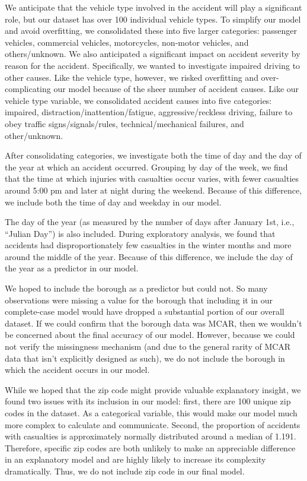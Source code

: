 \documentclass[
  letterpaper,
  DIV=11,
  numbers=noendperiod]{scrartcl}
\begin{document}
We anticipate that the vehicle type involved in the accident will play a
significant role, but our dataset has over 100 individual vehicle types.
To simplify our model and avoid overfitting, we consolidated these into
five larger categories: passenger vehicles, commercial vehicles,
motorcycles, non-motor vehicles, and others/unknown. We also anticipated
a significant impact on accident severity by reason for the accident.
Specifically, we wanted to investigate impaired driving to other causes.
Like the vehicle type, however, we risked overfitting and
over-complicating our model because of the sheer number of accident
causes. Like our vehicle type variable, we consolidated accident causes
into five categories: impaired, distraction/inattention/fatigue,
aggressive/reckless driving, failure to obey traffic
signs/signals/rules, technical/mechanical failures, and other/unknown.

After consolidating categories, we investigate both the time of day and
the day of the year at which an accident occurred. Grouping by day of
the week, we find that the time at which injuries with casualties occur
varies, with fewer casualties around 5:00 pm and later at night during
the weekend. Because of this difference, we include both the time of day
and weekday in our model.

The day of the year (as measured by the number of days after January
1st, i.e., ``Julian Day'') is also included. During exploratory
analysis, we found that accidents had disproportionately few casualties
in the winter months and more around the middle of the year. Because of
this difference, we include the day of the year as a predictor in our
model.

We hoped to include the borough as a predictor but could not. So many
observations were missing a value for the borough that including it in
our complete-case model would have dropped a substantial portion of our
overall dataset. If we could confirm that the borough data was MCAR,
then we wouldn't be concerned about the final accuracy of our model.
However, because we could not verify the missingness mechanism (and due
to the general rarity of MCAR data that isn't explicitly designed as
such), we do not include the borough in which the accident occurs in our
model.

While we hoped that the zip code might provide valuable explanatory
insight, we found two issues with its inclusion in our model: first,
there are 100 unique zip codes in the dataset. As a categorical
variable, this would make our model much more complex to calculate and
communicate. Second, the proportion of accidents with casualties is
approximately normally distributed around a median of 1.191. Therefore,
specific zip codes are both unlikely to make an appreciable difference
in an explanatory model and are highly likely to increase its complexity
dramatically. Thus, we do not include zip code in our final model.
\end{document}
